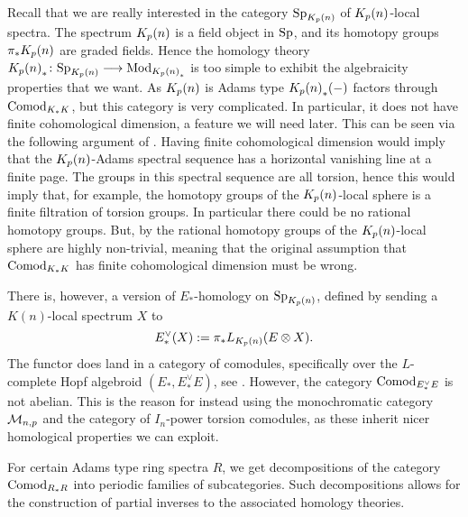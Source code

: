 \begin{remark}
    Recall that we are really interested in the category $\mathrm{Sp}_{{K_p(n)}}$ of ${K_p(n)}$-local spectra. The spectrum ${K_p(n)}$ is a field object in $\mathrm{Sp}$, and its homotopy groups $\pi_* {K_p(n)}$ are graded fields. Hence the homology theory ${K_p(n)}_*\colon \mathrm{Sp}_{{K_p(n)}}\longrightarrow \mathrm{Mod}_{{K_p(n)}_*}$ is too simple to exhibit the algebraicity properties that we want. As ${K_p(n)}$ is Adams type ${K_p(n)}_*(-)$ factors through $\mathrm{Comod}_{K_*K}$, but this category is very complicated. In particular, it does not have finite cohomological dimension, a feature we will need later. This can be seen via the following argument of \cite{barthel-pstragowski_2021}. Having finite cohomological dimension would imply that the ${K_p(n)}$-Adams spectral sequence has a horizontal vanishing line at a finite page. The groups in this spectral sequence are all torsion, hence this would imply that, for example, the homotopy groups of the ${K_p(n)}$-local sphere is a finite filtration of torsion groups. In particular there could be no rational homotopy groups. But, by \cite{barthel_schlank_stapleton_weinstein_2024} the rational homotopy groups of the ${K_p(n)}$-local sphere are highly non-trivial, meaning that the original assumption that $\mathrm{Comod}_{K_*K}$ has finite cohomological dimension must be wrong. 
    
    There is, however, a version of $E_*$-homology on $\mathrm{Sp}_{{K_p(n)}}$, defined by sending a $K(n)$-local spectrum $X$ to 
    \[E_*^\vee (X) := \pi_*L_{{K_p(n)}}(E\otimes X).\]
    The functor does land in a category of comodules, specifically over the $L$-complete Hopf algebroid $(E_*, E_*^\vee E)$, see \cite[5.3]{baker_2009}. However, the category $\mathrm{Comod}_{E_*^\vee E}$ is not abelian. This is the reason for instead using the monochromatic category $\mathcal{M}_{n,p}$ and the category of $I_n$-power torsion comodules, as these inherit nicer homological properties we can exploit. 
\end{remark}

For certain Adams type ring spectra $R$, we get decompositions of the category $\mathrm{Comod}_{R_*R}$ into periodic families of subcategories. Such decompositions allows for the construction of partial inverses to the associated homology theories. 

